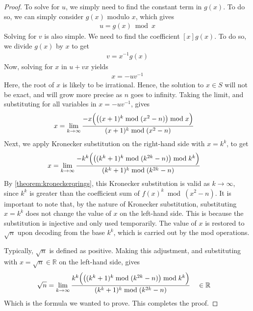 \documentclass[11pt,reqno]{article}
\theoremstyle{plain}
\theoremstyle{definition}
\begin{document}
\begin{proof}
To solve for $u$, we simply need to find the constant term in $g(x)$. To do so, we can simply consider $g(x)$ modulo $x$, which gives
\begin{align*}
u = g(x) \bmod{x}
\end{align*}
Solving for $v$ is also simple. We need to find the coefficient $[x] g(x)$. To do so, we divide $g(x)$ by $x$ to get
\begin{align*}
v = x^{-1} g(x)
\end{align*}
Now, solving for $x$ in $u + v x$ yields
\begin{align*}
x = -u v^{-1}
\end{align*}
Here, the root of $x$ is likely to be irrational. Hence, the solution to $x \in S$ will not be exact, and will grow more precise as $n$ goes to infinity. Taking the limit, and substituting for all variables in $x = -u v^{-1}$, gives
\begin{align*}
x &= \lim_{k\rightarrow\infty}
    \frac{-x \Bigl( \bigl( (x + 1)^k \bmod{(x^2-n)} \bigr) \bmod{x} \Bigr) }
        {(x + 1)^k \bmod{(x^2-n)}}
\end{align*}
Next, we apply Kronecker substitution on the right-hand side with $x = k^k$, to get
\begin{align*}
x &= \lim_{k\rightarrow\infty}
    \frac{-k^k \Bigl( \bigl( (k^k + 1)^k \bmod{(k^{2k}-n)} \bigr) \bmod{k^k} \Bigr)}
        {(k^k + 1)^k \bmod{(k^{2k}-n)}}
\end{align*}
By \cref{theorem:kroneckerqrings}, this Kronecker substitution is valid as $k\rightarrow\infty$, since $k^k$ is greater than the coefficient sum of $f(x)^k \bmod{(x^2-n)}$. It is important to note that, by the nature of Kronecker substitution, substituting $x=k^k$ does not change the value of $x$ on the left-hand side. This is because the substitution is injective and only used temporarily. The value of $x$ is restored to $\sqrt{n}$ upon decoding from the base $k^k$, which is carried out by the mod operations.

Typically, $\sqrt{n}$ is defined as positive. Making this adjustment, and substituting with $x = \sqrt{n} \in \mathbb{R}$ on the left-hand side, gives
\begin{align*}
\sqrt{n} &= \lim_{k\rightarrow\infty}
    \frac{k^k \Bigl( \bigl( (k^k + 1)^k \bmod{(k^{2k}-n)} \bigr) \bmod{k^k} \Bigr)}
        {(k^k + 1)^k \bmod{(k^{2k}-n)}}  \quad \in \mathbb{R}
\end{align*}
Which is the formula we wanted to prove. This completes the proof.
\end{proof}
\end{document}
